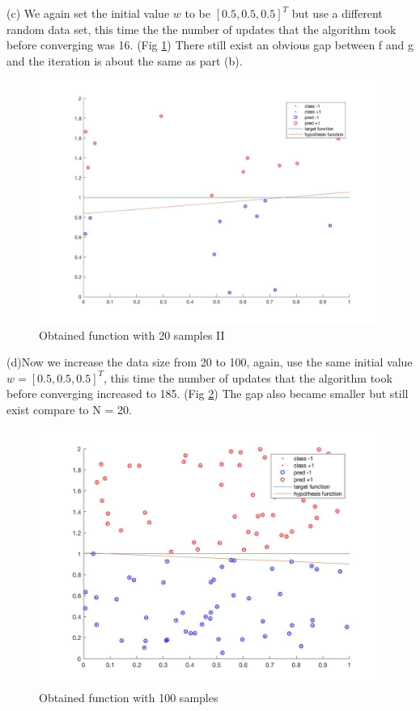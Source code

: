 \documentclass[12pt]{article}
\begin{document}
\indent (c) We again set the initial value $w$ to be $[0.5,0.5,0.5]^T$ but use a different random data set, this time the the number of updates that the algorithm took before converging was 16. (Fig \ref{fig:Pic4}) There still exist an obvious gap between f and g and the iteration is about the same as part (b).
\begin{figure}[H]
  \centering
  \includegraphics[scale = 0.25]{Pic4.jpg}
  \caption{Obtained function with 20 samples II}
  \label{fig:Pic4}
\end{figure}
\indent(d)Now we increase the data size from 20 to 100, again, use the same initial value $w=[0.5,0.5,0.5]^T$, this time the number of updates that the algorithm took before converging increased to 185. (Fig \ref{fig:Pic5}) The gap also became smaller but still exist compare to N = 20.
\begin{figure}[H]
  \centering
  \includegraphics[scale = 0.25]{Pic5.jpg}
  \caption{Obtained function with 100 samples}
  \label{fig:Pic5}
\end{figure}
\end{document}
